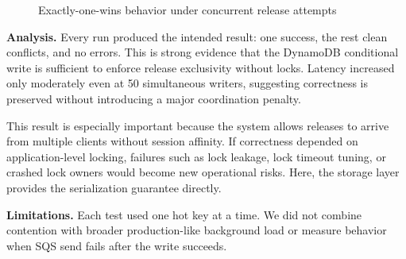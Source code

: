 \documentclass[10pt,letterpaper]{article}
\begin{document}
\begin{figure}[H]
\centering
{}
\hfill
{}
\caption{Exactly-one-wins behavior under concurrent release attempts}
\end{figure}

\begin{resultbox}
\textbf{Analysis.} Every run produced the intended result: one success, the rest clean conflicts, and no errors. This is strong evidence that the DynamoDB conditional write is sufficient to enforce release exclusivity without locks. Latency increased only moderately even at 50 simultaneous writers, suggesting correctness is preserved without introducing a major coordination penalty.

This result is especially important because the system allows releases to arrive from multiple clients without session affinity. If correctness depended on application-level locking, failures such as lock leakage, lock timeout tuning, or crashed lock owners would become new operational risks. Here, the storage layer provides the serialization guarantee directly.
\end{resultbox}

\begin{limitbox}
\textbf{Limitations.} Each test used one hot key at a time. We did not combine contention with broader production-like background load or measure behavior when SQS send fails after the write succeeds.
\end{limitbox}
\end{document}
